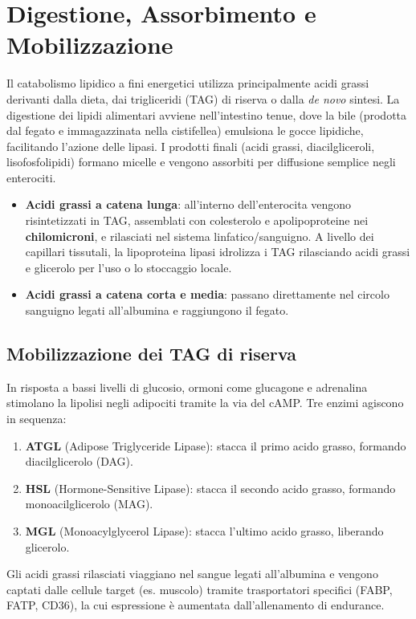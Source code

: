 \documentclass[12pt,a4paper]{report}
\begin{document}
\section{Digestione, Assorbimento e Mobilizzazione}
Il catabolismo lipidico a fini energetici utilizza principalmente acidi grassi derivanti dalla dieta, dai trigliceridi (TAG) di riserva o dalla \textit{de novo} sintesi. La digestione dei lipidi alimentari avviene nell'intestino tenue, dove la bile (prodotta dal fegato e immagazzinata nella cistifellea) emulsiona le gocce lipidiche, facilitando l'azione delle lipasi. I prodotti finali (acidi grassi, diacilgliceroli, lisofosfolipidi) formano micelle e vengono assorbiti per diffusione semplice negli enterociti.
\begin{itemize}
\item \textbf{Acidi grassi a catena lunga}: all'interno dell'enterocita vengono risintetizzati in TAG, assemblati con colesterolo e apolipoproteine nei \textbf{chilomicroni}, e rilasciati nel sistema linfatico/sanguigno. A livello dei capillari tissutali, la lipoproteina lipasi idrolizza i TAG rilasciando acidi grassi e glicerolo per l'uso o lo stoccaggio locale.
\item \textbf{Acidi grassi a catena corta e media}: passano direttamente nel circolo sanguigno legati all'albumina e raggiungono il fegato.
\end{itemize}
\subsection{Mobilizzazione dei TAG di riserva}
In risposta a bassi livelli di glucosio, ormoni come glucagone e adrenalina stimolano la lipolisi negli adipociti tramite la via del cAMP. Tre enzimi agiscono in sequenza:
\begin{enumerate}
\item \textbf{ATGL} (Adipose Triglyceride Lipase): stacca il primo acido grasso, formando diacilglicerolo (DAG).
\item \textbf{HSL} (Hormone-Sensitive Lipase): stacca il secondo acido grasso, formando monoacilglicerolo (MAG).
\item \textbf{MGL} (Monoacylglycerol Lipase): stacca l'ultimo acido grasso, liberando glicerolo.
\end{enumerate}
Gli acidi grassi rilasciati viaggiano nel sangue legati all'albumina e vengono captati dalle cellule target (es. muscolo) tramite trasportatori specifici (FABP, FATP, CD36), la cui espressione è aumentata dall'allenamento di endurance.
\end{document}
